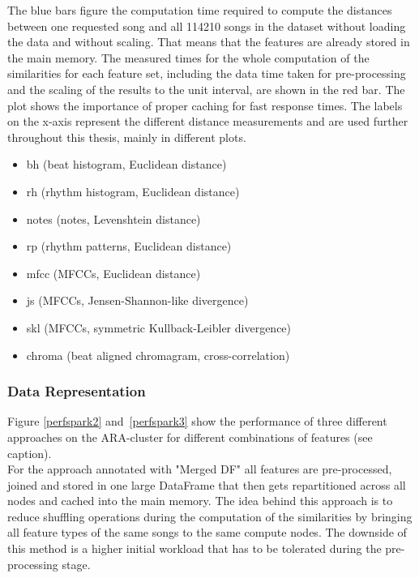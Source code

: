 \noindent The blue bars figure the computation time required to compute the distances between one requested song and all 114210 songs in the dataset without loading the data and without scaling. That means that the features are already stored in the main memory. The measured times for the whole computation of the similarities for each feature set, including the data time taken for pre-processing and the scaling of the results to the unit interval, are shown in the red bar. The plot shows the importance of proper caching for fast response times. 
\noindent The labels on the x-axis represent the different distance measurements and are used further throughout this thesis, mainly in different plots. 

\begin{itemize}
	\setlength\itemsep{-0.5em}
	\item bh (beat histogram, Euclidean distance)
	\item rh (rhythm histogram, Euclidean distance)
	\item notes (notes, Levenshtein distance)
	\item rp (rhythm patterns, Euclidean distance)
	\item mfcc (MFCCs, Euclidean distance)
	\item js (MFCCs, Jensen-Shannon-like divergence)
	\item skl (MFCCs, symmetric Kullback-Leibler divergence)
	\item chroma (beat aligned chromagram, cross-correlation)
\end{itemize}

\subsubsection{Data Representation}

\noindent Figure \ref {perfspark2} and~\ref{perfspark3} show the performance of three different approaches on the ARA-cluster for different combinations of features (see caption).\\
\noindent For the approach annotated with "Merged DF" all features are pre-processed, joined and stored in one large DataFrame that then gets repartitioned across all nodes and cached into the main memory. The idea behind this approach is to reduce shuffling operations during the computation of the similarities by bringing all feature types of the same songs to the same compute nodes. The downside of this method is a higher initial workload that has to be tolerated during the pre-processing stage. 


